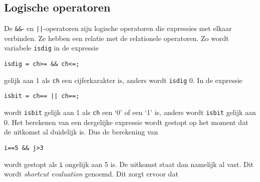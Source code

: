 
\subsection{Logische operatoren}
De \texttt{\&\&}- en \texttt{||}-operatoren zijn logische operatoren die expressies met elkaar verbinden. Ze hebben een relatie met de relationele operatoren. Zo wordt variabele \texttt{isdig} in de expressie

\hspace*{1em}\texttt{isdig = ch>=\textquotesingle\ \&\& ch<=\textquotesingle;}

gelijk aan 1 als \texttt{ch} een cijferkarakter is, anders wordt \texttt{isdig} 0. In de expressie

\hspace*{1em}\texttt{isbit = ch==\textquotesingle\ || ch==\textquotesingle;}

wordt \texttt{isbit} gelijk aan 1 als \texttt{ch} een `0' of een `1' is, anders wordt \texttt{isbit} gelijk aan 0. Het berekenen van een dergelijke expressie wordt gestopt op het moment dat de uitkomst al duidelijk is. Dus de berekening van

\begin{lstlisting}[style=lstoneline]
i==5 && j>3
\end{lstlisting}

wordt gestopt als \texttt{i} ongelijk aan 5 is. De uitkomst staat dan namelijk al vast. Dit wordt \textsl{shortcut evaluation} genoemd. Dit zorgt ervoor dat

